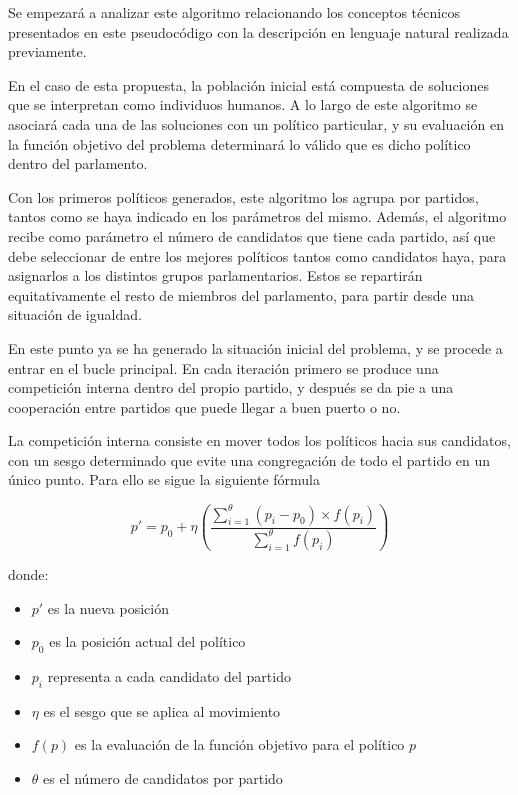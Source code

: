 Se empezará a analizar este algoritmo relacionando los conceptos técnicos presentados en este pseudocódigo con la descripción en lenguaje natural realizada previamente.

En el caso de esta propuesta, la población inicial está compuesta de soluciones que se interpretan como individuos humanos. A lo largo de este algoritmo se asociará cada una de las soluciones con un político particular, y su evaluación en la función objetivo del problema determinará lo válido que es dicho político dentro del parlamento.

Con los primeros políticos generados, este algoritmo los agrupa por partidos, tantos como se haya indicado en los parámetros del mismo. Además, el algoritmo recibe como parámetro el número de candidatos que tiene cada partido, así que debe seleccionar de entre los mejores políticos tantos como candidatos haya, para asignarlos a los distintos grupos parlamentarios. Estos se repartirán equitativamente el resto de miembros del parlamento, para partir desde una situación de igualdad.

En este punto ya se ha generado la situación inicial del problema, y se procede a entrar en el bucle principal. En cada iteración primero se produce una competición interna dentro del propio partido, y después se da pie a una cooperación entre partidos que puede llegar a buen puerto o no.

La competición interna consiste en mover todos los políticos hacia sus candidatos, con un sesgo determinado que evite una congregación de todo el partido en un único punto. Para ello se sigue la siguiente fórmula

\begin{equation}\label{poa-eq-desplazamiento}
	p' = p_0 + \eta(\frac{\sum_{i=1}^{\theta}(p_i - p_0) \times f(p_i)}{\sum_{i=1}^{\theta}f(p_i)})
\end{equation}

donde:

\begin{itemize}
	\item $p'$ es la nueva posición
	\item $p_0$ es la posición actual del político
	\item $p_i$ representa a cada candidato del partido
	\item $\eta$ es el sesgo que se aplica al movimiento
	\item $f(p)$ es la evaluación de la función objetivo para el político $p$
	\item $\theta$ es el número de candidatos por partido
\end{itemize}

